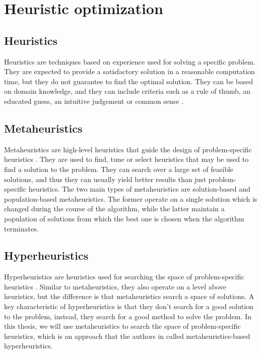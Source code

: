 \section{Heuristic optimization}
\label{sec:heuristic_optimization}

\subsection{Heuristics}
\label{sec:heuristics}
Heuristics are techniques based on experience used for solving a specific problem. They are expected to provide a satisfactory solution in a reasonable computation time, but they do not guarantee to find the optimal solution. They can be based on domain knowledge, and they can include criteria such as a rule of thumb, an educated guess, an intuitive judgement or common sense \citep{swamy2016search}.

\subsection{Metaheuristics}
\label{sec:metaheuristics}
Metaheuristics are high-level heuristics that guide the design of problem-specific heuristics \citep{swamy2016search}. They are used to find, tune or select heuristics that may be used to find a solution to the problem. They can search over a large set of feasible solutions, and thus they can usually yield better results than just problem-specific heuristics. The two main types of metaheuristics are solution-based and population-based metaheuristics. The former operate on a single solution which is changed during the course of the algorithm, while the latter maintain a population of solutions from which the best one is chosen when the algorithm terminates.

\subsection{Hyperheuristics}
\label{sec:hyperheuristics}
Hyperheuristics are heuristics used for searching the space of problem-specific heuristics \citep{Chakhlevitch2008}. Similar to metaheuristics, they also operate on a level above heuristics, but the difference is that metaheuristics search a space of solutions. A key characteristic of hyperheuristics is that they don't search for a good solution to the problem, instead, they search for a good method to solve the problem. In this thesis, we will use metaheuristics to search the space of problem-specific heuristics, which is an approach that the authors in \citep{Chakhlevitch2008} called metaheuristics-based hyperheuristics.